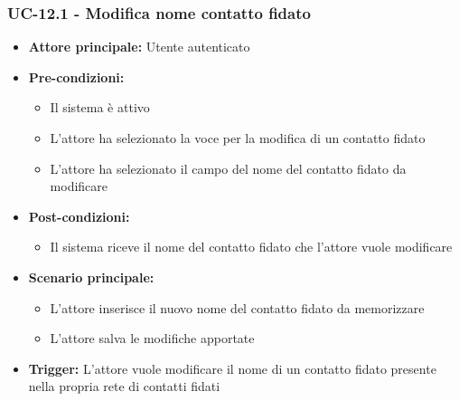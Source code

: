 \documentclass[a4paper,12pt]{article}
\begin{document}
\subsubsection{UC-12.1 - Modifica nome contatto fidato} \label{subsec:UC-12.1}
\begin{itemize}
    \item \textbf{Attore principale:} Utente autenticato
    \item \textbf{Pre-condizioni:}
    \begin{itemize}
        \item Il sistema è attivo
        \item L'attore ha selezionato la voce per la modifica di un contatto fidato
        \item L'attore ha selezionato il campo del nome del contatto fidato da modificare
    \end{itemize}
    \item \textbf{Post-condizioni:} 
    \begin{itemize}
        \item Il sistema riceve il nome del contatto fidato che l'attore vuole modificare
    \end{itemize}
    \item \textbf{Scenario principale:} 
    \begin{itemize}
        \item L'attore inserisce il nuovo nome del contatto fidato da memorizzare
        \item L'attore salva le modifiche apportate
    \end{itemize}
    \item \textbf{Trigger:} L'attore vuole modificare il nome di un contatto fidato presente nella propria rete di contatti fidati
\end{itemize}
\end{document}
